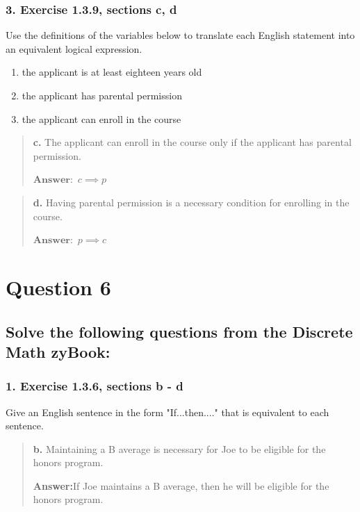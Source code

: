 \documentclass[11pt, oneside]{article}
\begin{document}
\pagebreak

\subsubsection*{3. Exercise 1.3.9, sections c, d}

Use the definitions of the variables below to translate each English statement into an equivalent logical expression.

\begin{enumerate}
    \item[y:] the applicant is at least eighteen years old
    \item[p:] the applicant has parental permission
    \item[c:] the applicant can enroll in the course
\end{enumerate}

\begin{quote}
    \textbf{c. }The applicant can enroll in the course only if the applicant has parental permission.

    \(\textbf{Answer:}\enspace c \implies p\)
\end{quote}

\begin{quote}
    \textbf{d. }Having parental permission is a necessary condition for enrolling in the course.

    \(\textbf{Answer:}\enspace p \implies c\)
\end{quote}

\pagebreak

\section*{Question 6}

\subsection*{Solve the following questions from the Discrete Math zyBook:}

\subsubsection*{1. Exercise 1.3.6, sections b - d}

Give an English sentence in the form "If...then...." that is equivalent to each sentence.

\begin{quote}
    \textbf{b. }Maintaining a B average is necessary for Joe to be eligible for the honors program.

    \textbf{Answer:}\enspace If Joe maintains a B average, then he will be eligible for the honors program.
\end{quote}
\end{document}
